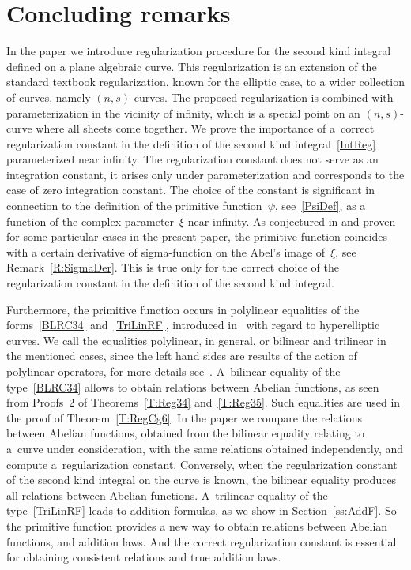 \documentclass[pdftex]{sigma}
\numberwithin{equation}{section}
\begin{document}
\section{Concluding remarks}
In the paper we introduce regularization procedure for the second kind integral defined on a plane algebraic curve. This regularization is an extension of the standard textbook regularization, known for the elliptic case, to a wider collection of curves, namely $(n,s)$-curves. The proposed regularization is combined with parameterization in the vicinity of infinity, which is a special point on an $(n,s)$-curve where all sheets come together. We prove the importance of a~correct regularization constant in the definition of the second kind integral~\eqref{IntReg} parameterized near infinity. The regularization constant does not serve as an integration constant, it arises only under parameterization and corresponds to the case of zero integration constant. The choice of the constant is significant in connection to the definition of the primitive function~$\psi$, see~\eqref{PsiDef}, as a function of the complex parameter~$\xi$ near infinity. As conjectured in \cite{BL2005} and proven for some particular cases in the present paper, the primitive function coincides with a certain derivative of sigma-function on the Abel's image of~$\xi$, see Remark~\ref{R:SigmaDer}. This is true only for the correct choice of the regularization constant in the definition of the second kind integral.

{\sloppy Furthermore, the primitive function occurs in polylinear equalities of the forms~\eqref{BLRC34} and~\eqref{TriLinRF}, introduced in~\cite{BL2005} with regard to hyperelliptic curves. We call the equalities polylinear, in general, or bilinear and trilinear in the mentioned cases, since the left hand sides are results of the action of polylinear operators, for more details see~\cite{BL2005}. A~bilinear equality of the type~\eqref{BLRC34} allows to obtain relations between Abelian functions, as seen from Proofs~2 of Theorems~\ref{T:Reg34} and~\ref{T:Reg35}. Such equalities are used in the proof of Theorem~\ref{T:RegCg6}. In the paper we compare the relations between Abelian functions, obtained from the bilinear equality relating to a~curve under consideration, with the same relations obtained independently, and compute a~regularization constant. Conversely, when the regularization constant of the second kind integral on the curve is known, the bilinear equality produces all relations between Abelian functions. A~trilinear equality of the type~\eqref{TriLinRF} leads to addition formulas, as we show in Section~\ref{ss:AddF}. So the primitive function provides a new way to obtain relations between Abelian functions, and addition laws. And the correct regularization constant is essential for obtaining consistent relations and true addition laws.

}
\end{document}
